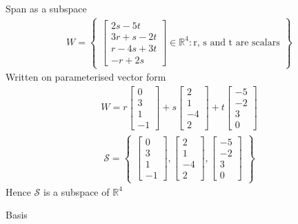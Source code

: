 \begin{example}{Span as a subspace}
\begin{align*}
    W = \begin{Bmatrix}
    \begin{bmatrix}
    2s-5t\\3r+s-2t\\r-4s+3t\\-r+2s
    \end{bmatrix}
        \in \mathbb{R}^4:\text{r, s and t are scalars}
    \end{Bmatrix}
\end{align*}
Written on parameterised vector form
\begin{align*}
    W =
    r \begin{bmatrix}
        0 \\ 3 \\1 \\ -1
    \end{bmatrix}
    +s\begin{bmatrix}
        2 \\ 1 \\ -4 \\ 2
    \end{bmatrix}
    +t\begin{bmatrix}
        -5 \\ -2 \\ 3 \\ 0
    \end{bmatrix}
\end{align*}
\begin{align*}
    \mathcal{S}=
    \begin{Bmatrix}
    \begin{bmatrix}
        0 \\ 3 \\1 \\ -1
    \end{bmatrix}, 
    \begin{bmatrix}
        2 \\ 1 \\ -4 \\ 2
    \end{bmatrix},
    \begin{bmatrix}
        -5 \\ -2 \\ 3 \\ 0
    \end{bmatrix}
    \end{Bmatrix}
\end{align*}
Hence $\mathcal{S}$ is a subspace of $\mathbb{R}^4$
\end{example}

\begin{definition}{Basis}

\end{definition}
